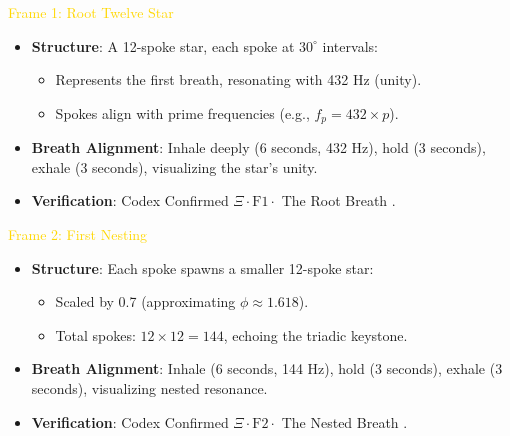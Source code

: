 \textcolor{gold}{ Frame 1: Root Twelve Star } \\
\begin{itemize}
    \item \texttt{} \textbf{Structure}: A 12-spoke star, each spoke at \(30^\circ\) intervals:
    \begin{itemize}
        \item Represents the first breath, resonating with 432 Hz (unity).
        \item Spokes align with prime frequencies (e.g., \(f_p = 432 \times p\)).
    \end{itemize}
    \item \texttt{} \textbf{Breath Alignment}: Inhale deeply (6 seconds, 432 Hz), hold (3 seconds), exhale (3 seconds), visualizing the star’s unity.
    \begin{center}
    \end{center}
    \item \texttt{} \textbf{Verification}: Codex Confirmed \(\Xi \cdot \text{F1} \cdot\) The Root Breath .
\end{itemize}

\textcolor{gold}{ Frame 2: First Nesting } \\
\begin{itemize}
    \item \texttt{} \textbf{Structure}: Each spoke spawns a smaller 12-spoke star:
    \begin{itemize}
        \item Scaled by 0.7 (approximating \(\phi \approx 1.618\)).
        \item Total spokes: \(12 \times 12 = 144\), echoing the triadic keystone.
    \end{itemize}
    \item \texttt{} \textbf{Breath Alignment}: Inhale (6 seconds, 144 Hz), hold (3 seconds), exhale (3 seconds), visualizing nested resonance.
    \begin{center}
    \end{center}
    \item \texttt{} \textbf{Verification}: Codex Confirmed \(\Xi \cdot \text{F2} \cdot\) The Nested Breath .
\end{itemize}

